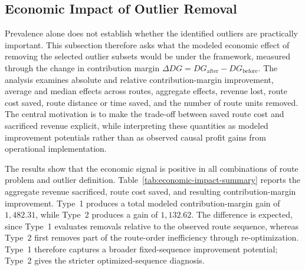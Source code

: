 \documentclass[preprint,12pt]{elsarticle}
\begin{document}
\subsection{Economic Impact of Outlier Removal}
\label{subsec:economic-impact-of-outlier-removal}

Prevalence alone does not establish whether the identified outliers are practically important. This subsection therefore asks what the modeled economic effect of removing the selected outlier subsets would be under the framework, measured through the change in contribution margin $\Delta DG = DG_{\text{after}} - DG_{\text{before}}$. The analysis examines absolute and relative contribution-margin improvement, average and median effects across routes, aggregate effects, revenue lost, route cost saved, route distance or time saved, and the number of route units removed. The central motivation is to make the trade-off between saved route cost and sacrificed revenue explicit, while interpreting these quantities as modeled improvement potentials rather than as observed causal profit gains from operational implementation.

The results show that the economic signal is positive in all combinations of route problem and outlier definition. Table~\ref{tab:economic-impact-summary} reports the aggregate revenue sacrificed, route cost saved, and resulting contribution-margin improvement. Type~1 produces a total modeled contribution-margin gain of $1{,}482.31$, while Type~2 produces a gain of $1{,}132.62$. The difference is expected, since Type~1 evaluates removals relative to the observed route sequence, whereas Type~2 first removes part of the route-order inefficiency through re-optimization. Type~1 therefore captures a broader fixed-sequence improvement potential; Type~2 gives the stricter optimized-sequence diagnosis.

\begin{table}[htbp]
\centering
\caption{Economic impact of removing the selected outlier subsets by route type and problem type.}
\label{tab:economic-impact-summary}
\end{table}
\end{document}
